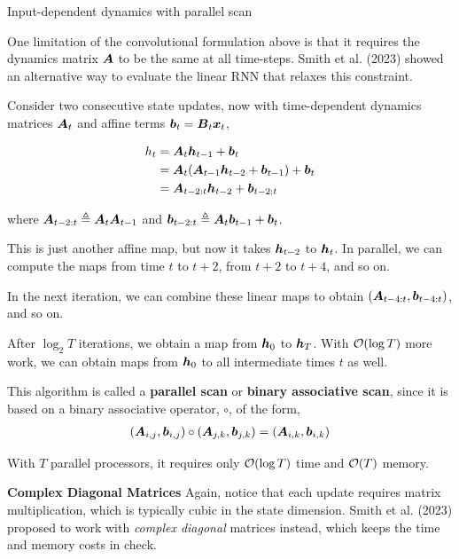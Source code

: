 \documentclass[aspectratio=169]{beamer}
\begin{document}
\begin{frame}[t,allowframebreaks]{Input-dependent dynamics with parallel
scan}\label{input-dependent-dynamics-with-parallel-scan}

One limitation of the convolutional formulation above is that it
requires the dynamics matrix \(\boldsymbol{A}\) to be the same at all time-steps.
Smith et al. (2023) showed an alternative way to
evaluate the linear RNN that relaxes this constraint.

Consider two consecutive state updates, now with time-dependent dynamics
matrices \(\boldsymbol{A}_t\) and affine terms \(\boldsymbol{b}_t = \boldsymbol{B}_t \boldsymbol{x}_t\),

\begin{align*}
h_t
&= \boldsymbol{A}_t \boldsymbol{h}_{t-1} + \boldsymbol{b}_t \\
&= \boldsymbol{A}_t (\boldsymbol{A}_{t-1} \boldsymbol{h}_{t-2} + \boldsymbol{b}_{t-1}) + \boldsymbol{b}_t \\
&= \boldsymbol{A}_{t-2:t} \boldsymbol{h}_{t-2} + \boldsymbol{b}_{t-2:t}
\end{align*}

where \(\boldsymbol{A}_{t-2:t} \triangleq \boldsymbol{A}_t \boldsymbol{A}_{t-1}\) and
\(\boldsymbol{b}_{t-2:t} \triangleq \boldsymbol{A}_t \boldsymbol{b}_{t-1} + \boldsymbol{b}_t\).

This is just another affine map, but now it takes \(\boldsymbol{h}_{t-2}\) to
\(\boldsymbol{h}_t\). In parallel, we can compute the maps from time \(t\) to
\(t+2\), from \(t+2\) to \(t+4\), and so on.

In the next iteration, we can combine these linear maps to obtain
\((\boldsymbol{A}_{t-4:t}, \boldsymbol{b}_{t-4:t})\), and so on.

After \(\log_2 T\) iterations, we obtain a map from \(\boldsymbol{h}_0\) to
\(\boldsymbol{h}_T\). With \(\mathcal{O}(\log T)\) more work, we can obtain maps from
\(\boldsymbol{h}_0\) to all intermediate times \(t\) as well.

This algorithm is called a \textbf{parallel scan} or \textbf{binary
associative scan}, since it is based on a binary associative operator,
\(\circ\), of the form, \begin{align*}
(\boldsymbol{A}_{i,j}, \boldsymbol{b}_{i,j}) \circ (\boldsymbol{A}_{j,k}, \boldsymbol{b}_{j,k}) = (\boldsymbol{A}_{i,k}, \boldsymbol{b}_{i,k})
\end{align*}

With \(T\) parallel processors, it requires only \(\mathcal{O}(\log T)\) time
and \(\mathcal{O}(T)\) memory.

\textbf{Complex Diagonal Matrices}
Again, notice that each update requires matrix multiplication, which is
typically cubic in the state dimension.
Smith et al. (2023) proposed to work with
\emph{complex diagonal} matrices instead, which keeps the time and
memory costs in check. 
\end{frame}
\end{document}

